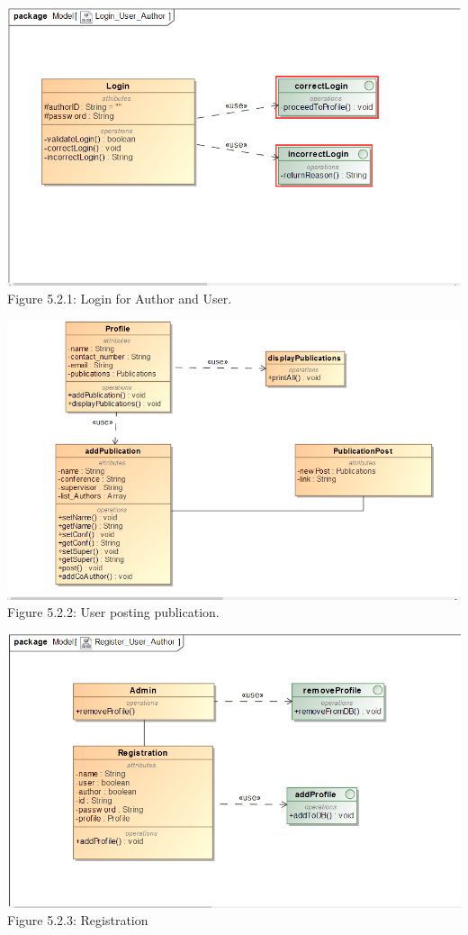 \documentclass[hidelinks,a4paper,12pt]{article}
\begin{document}
	\includegraphics[width=1\textwidth]{./Login.png}\\[0.4cm]  
	
	Figure 5.2.1: Login for Author and User.
	
	\includegraphics[width=1\textwidth]{./Posting.png}\\[0.4cm]  
	
	Figure 5.2.2: User posting publication.
	
	
	\includegraphics[width=1\textwidth]{./Registration.png}\\[0.4cm]  
	Figure 5.2.3: Registration
	
\end{document}
